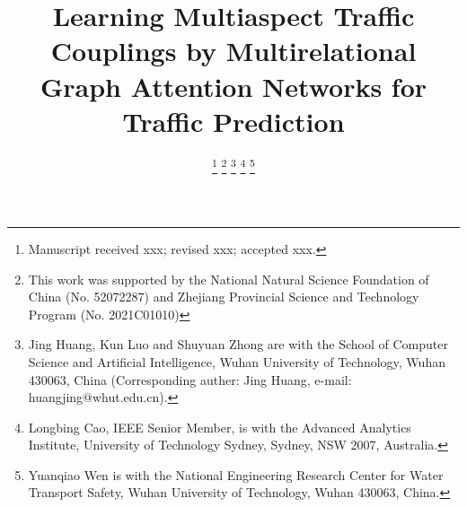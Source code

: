\documentclass[journal]{IEEEtran}
\begin{document}
\title{Learning Multiaspect Traffic Couplings by Multirelational Graph Attention Networks for Traffic Prediction}

\author{
    \thanks{Manuscript received xxx; revised xxx; accepted xxx.}
    \thanks{This work was supported by the National Natural Science Foundation of China (No. 52072287) and Zhejiang  Provincial  Science  and  Technology  Program (No. 2021C01010)}
    \thanks{Jing Huang, Kun Luo and Shuyuan Zhong are with the School of Computer Science and Artificial Intelligence, Wuhan University of Technology, Wuhan 430063, China (Corresponding auther: Jing Huang, e-mail: huangjing@whut.edu.cn).}
    \thanks{Longbing Cao, IEEE Senior Member, is with the Advanced Analytics Institute, University of Technology Sydney, Sydney, NSW 2007, Australia.}
    \thanks{Yuanqiao Wen is with the National Engineering Research Center for Water Transport Safety, Wuhan University of Technology, Wuhan 430063, China.}
}
\end{document}
